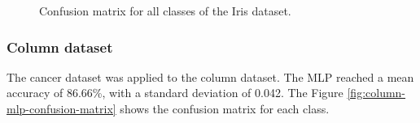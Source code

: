 \documentclass[12pt,a4paper]{article}
\begin{document}
\begin{figure}[H]

\caption{Confusion matrix for all classes of the Iris dataset.}
\label{fig:iris-mlp-confusion-matrix}

\end{figure}

\subsubsection*{Column dataset}

The cancer dataset was applied to the column dataset. The MLP reached a mean accuracy of 86.66\%, with a standard deviation of 0.042. The Figure \ref{fig:column-mlp-confusion-matrix} shows the confusion matrix for each class.
\end{document}
